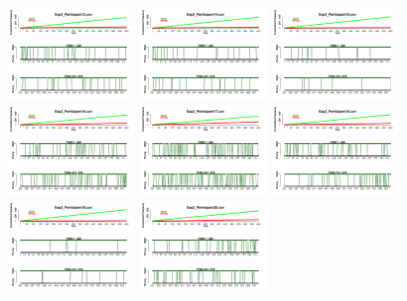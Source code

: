\begin{figure}[th]
\includegraphics[width=0.30\textwidth]{Figures/Success_Exp2_P13} \includegraphics[width=0.30\textwidth]{Figures/Success_Exp2_P14} \includegraphics[width=0.30\textwidth]{Figures/Success_Exp2_P15}
\includegraphics[width=0.30\textwidth]{Figures/Success_Exp2_P16} \includegraphics[width=0.30\textwidth]{Figures/Success_Exp2_P17} \includegraphics[width=0.30\textwidth]{Figures/Success_Exp2_P18}
\includegraphics[width=0.30\textwidth]{Figures/Success_Exp2_P19} \includegraphics[width=0.30\textwidth]{Figures/Success_Exp2_P20} 

\end{figure}
